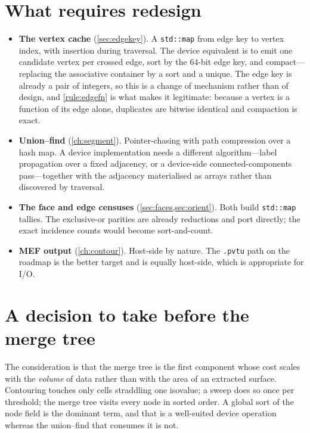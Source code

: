 \section{What requires redesign}

\begin{itemize}[leftmargin=*]
\item \textbf{The vertex cache} (\cref{sec:edgekey}). A \texttt{std::map} from
  edge key to vertex index, with insertion during traversal. The device
  equivalent is to emit one candidate vertex per crossed edge, sort by the
  $64$-bit edge key, and compact---replacing the associative container by a sort
  and a unique. The edge key is already a pair of integers, so this is a change
  of mechanism rather than of design, and \cref{rule:edgefn} is what makes it
  legitimate: because a vertex is a function of its edge alone, duplicates are
  bitwise identical and compaction is exact.
\item \textbf{Union--find} (\cref{ch:segment}). Pointer-chasing with path
  compression over a hash map. A device implementation needs a different
  algorithm---label propagation over a fixed adjacency, or a device-side
  connected-components pass---together with the adjacency materialised as arrays
  rather than discovered by traversal.
\item \textbf{The face and edge censuses} (\cref{sec:faces,sec:orient}). Both
  build \texttt{std::map} tallies. The exclusive-or parities are already
  reductions and port directly; the exact incidence counts would become
  sort-and-count.
\item \textbf{MEF output} (\cref{ch:contour}). Host-side by nature. The
  \texttt{.pvtu} path on the roadmap is the better target and is equally
  host-side, which is appropriate for I/O.
\end{itemize}

\section{A decision to take before the merge tree}


The consideration is that the merge tree is the first component whose cost scales
with the \emph{volume} of data rather than with the area of an extracted surface.
Contouring touches only cells straddling one isovalue; a sweep does so once per
threshold; the merge tree visits every node in sorted order. A global sort of the
node field is the dominant term, and that is a well-suited device operation
whereas the union--find that consumes it is not.

